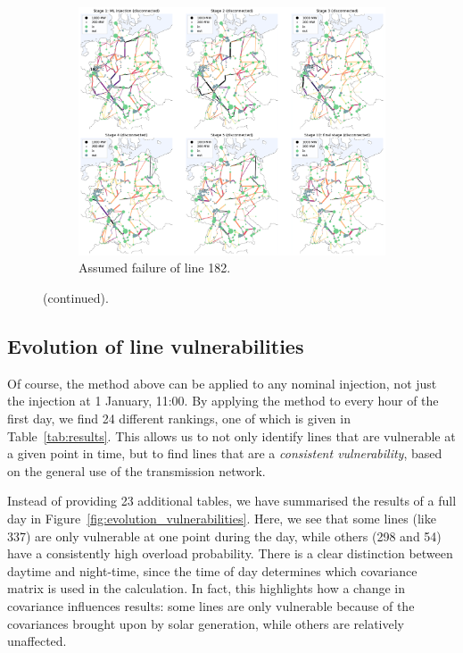 \documentclass[main.tex]{subfiles}
\begin{document}
\begin{figure}[ht]
\renewcommand\figurename{Interactive Figure}
\ContinuedFloat
\begin{subfigure}{\textwidth}
    \centering
    \includegraphics[width=\textwidth]{img/master_with_cov_182.pdf}
    \caption{Assumed failure of line 182.}\label{ifig:master182}
\end{subfigure}
%
    \caption{(continued).}\label{ifig:mastercont}
\end{figure}

\subsection{Evolution of line vulnerabilities}\label{sec:evolution}
Of course, the method above can be applied to any nominal injection, not just the injection at 1 January, 11:00. By applying the method to every hour of the first day, we find 24 different rankings, one of which is given in Table~\ref{tab:results}. This allows us to not only identify lines that are vulnerable at a given point in time, but to find lines that are a \emph{consistent vulnerability}, based on the general use of the transmission network.

Instead of providing 23 additional tables, we have summarised the results of a full day in Figure~\ref{fig:evolution_vulnerabilities}. Here, we see that some lines (like 337) are only vulnerable at one point during the day, while others (298 and 54) have a consistently high overload probability. There is a clear distinction between daytime and night-time, since the time of day determines which covariance matrix is used in the calculation. In fact, this highlights how a change in covariance influences results: some lines are only vulnerable because of the covariances brought upon by solar generation, while others are relatively unaffected.
\end{document}
